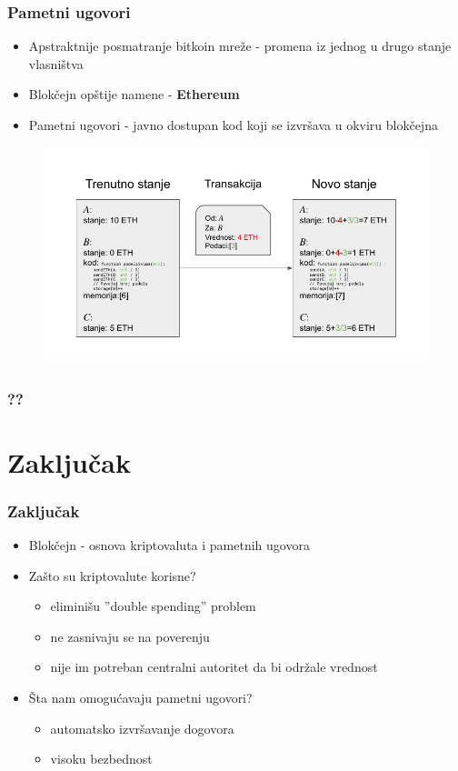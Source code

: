 \documentclass{beamer}
\begin{document}
\begin{frame}[fragile]\frametitle{Pametni ugovori}
	\begin{itemize}
		\item Apstraktnije posmatranje bitkoin mreže - promena iz jednog u drugo stanje vlasništva
		\item Blokčejn opštije namene - \textbf{Ethereum}
		\item Pametni ugovori - javno dostupan kod koji se izvršava u okviru blokčejna
	\end{itemize}

	\begin{figure}[H]
		\includegraphics[scale=0.55]{Ethereum_State_Transition.pdf}
	\end{figure}
\end{frame}

\begin{frame}[fragile]\frametitle{??}
	
\end{frame}


\section{Zaključak}

\begin{frame}[fragile]\frametitle{Zaključak}
	\begin{itemize}
        \item Blokčejn - osnova kriptovaluta i pametnih ugovora
	    \item Zašto su kriptovalute korisne?
        \begin{itemize}
            \item eliminišu ''double spending'' problem
            \item ne zasnivaju se na poverenju
            \item nije im potreban centralni autoritet da bi održale vrednost
            \end{itemize}
        \item Šta nam omogućavaju pametni ugovori?
        \begin{itemize}
            \item automatsko izvršavanje dogovora
            \item visoku bezbednost
        \end{itemize}
	\end{itemize}
\end{frame}
\end{document}
